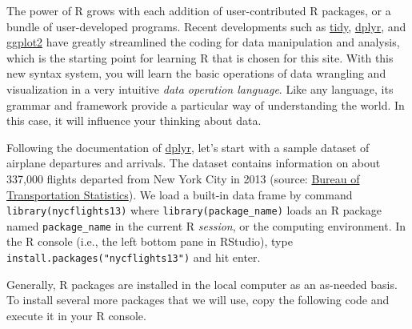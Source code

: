 \documentclass[]{book}
\theoremstyle{definition}
\theoremstyle{definition}
\theoremstyle{remark}
\begin{document}
The power of R grows with each addition of user-contributed R packages,
or a bundle of user-developed programs. Recent developments such as
\href{https://cran.r-project.org/web/packages/tidyr/vignettes/tidy-data.html}{tidy},
\href{https://cran.r-project.org/web/packages/dplyr/vignettes/introduction.html}{dplyr},
and \href{http://docs.ggplot2.org/current/}{ggplot2} have greatly
streamlined the coding for data manipulation and analysis, which is the
starting point for learning R that is chosen for this site. With this
new syntax system, you will learn the basic operations of data wrangling
and visualization in a very intuitive \emph{data operation language}.
Like any language, its grammar and framework provide a particular way of
understanding the world. In this case, it will influence your thinking
about data.

Following the documentation of
\href{https://cran.r-project.org/web/packages/dplyr/vignettes/introduction.html}{dplyr},
let's start with a sample dataset of airplane departures and arrivals.
The dataset contains information on about 337,000 flights departed from
New York City in 2013 (source:
\href{https://www.transtats.bts.gov/DatabaseInfo.asp?DB_ID=120\&Link=0}{Bureau
of Transportation Statistics}). We load a built-in data frame by command
\texttt{library(nycflights13)} where \texttt{library(package\_name)}
loads an R package named \texttt{package\_name} in the current R
\emph{session}, or the computing environment. In the R console (i.e.,
the left bottom pane in RStudio), type
\texttt{install.packages("nycflights13")} and hit enter.

Generally, R packages are installed in the local computer as an
as-needed basis. To install several more packages that we will use, copy
the following code and execute it in your R console.
\end{document}
